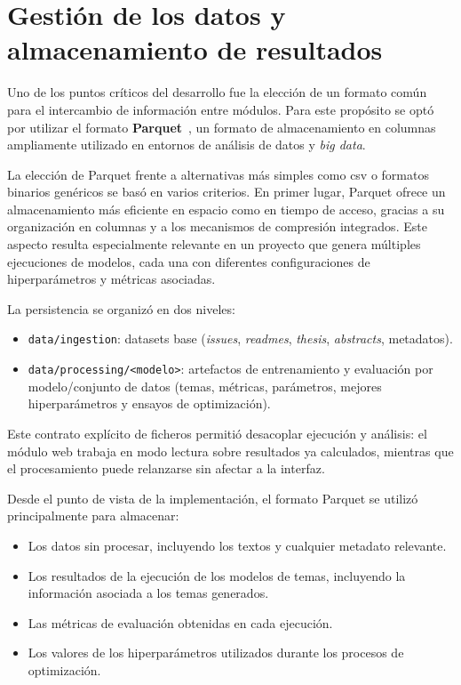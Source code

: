 \section{Gestión de los datos y almacenamiento de resultados}

Uno de los puntos críticos del desarrollo fue la elección de un formato común
para el intercambio de información entre módulos. Para este propósito se optó
por utilizar el formato \textbf{Parquet}~\cite{ParquetDocumentation}, un
formato de almacenamiento en columnas ampliamente utilizado en entornos de
análisis de datos y \textit{big data}.

La elección de Parquet frente a alternativas más simples como \acrfull{csv} o
formatos binarios genéricos se basó en varios criterios. En primer lugar,
Parquet ofrece un almacenamiento más eficiente en espacio como en tiempo de
acceso, gracias a su organización en columnas y a los mecanismos de compresión
integrados. Este aspecto resulta especialmente relevante en un proyecto que
genera múltiples ejecuciones de modelos, cada una con diferentes
configuraciones de hiperparámetros y métricas asociadas.

La persistencia se organizó en dos niveles:
\begin{itemize}
      \item \texttt{data/ingestion}: datasets base (\textit{issues}, \textit{readmes}, \textit{thesis}, \textit{abstracts}, metadatos).
      \item \texttt{data/processing/<modelo>}: artefactos de entrenamiento y evaluación por modelo/conjunto de datos (temas, métricas, parámetros, mejores hiperparámetros y ensayos de optimización).
\end{itemize}

Este contrato explícito de ficheros permitió desacoplar ejecución y análisis:
el módulo web trabaja en modo lectura sobre resultados ya calculados, mientras
que el procesamiento puede relanzarse sin afectar a la interfaz.

Desde el punto de vista de la implementación, el formato Parquet se utilizó
principalmente para almacenar:
\begin{itemize}
      \item Los datos sin procesar, incluyendo los textos y cualquier metadato relevante.
      \item Los resultados de la ejecución de los modelos de temas, incluyendo la
            información asociada a los temas generados.
      \item Las métricas de evaluación obtenidas en cada ejecución.
      \item Los valores de los hiperparámetros utilizados durante los procesos de
            optimización.
\end{itemize}


